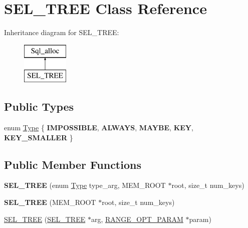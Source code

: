 \hypertarget{classSEL__TREE}{}\section{S\+E\+L\+\_\+\+T\+R\+EE Class Reference}
\label{classSEL__TREE}
Inheritance diagram for S\+E\+L\+\_\+\+T\+R\+EE\+:\begin{figure}[H]
\begin{center}
\leavevmode
\includegraphics[height=2.000000cm]{classSEL__TREE}
\end{center}
\end{figure}
\subsection*{Public Types}
\begin{DoxyCompactItemize}
\item 
enum \mbox{\hyperlink{classSEL__TREE_ab2c33faad20fa0700f23ed800de66cc8}{Type}} \{ \newline
{\bfseries I\+M\+P\+O\+S\+S\+I\+B\+LE}, 
{\bfseries A\+L\+W\+A\+YS}, 
{\bfseries M\+A\+Y\+BE}, 
{\bfseries K\+EY}, 
\newline
{\bfseries K\+E\+Y\+\_\+\+S\+M\+A\+L\+L\+ER}
 \}
\end{DoxyCompactItemize}
\subsection*{Public Member Functions}
\begin{DoxyCompactItemize}
\item 
\mbox{\label{classSEL__TREE_aca2f62c9e9cfffba813cdc3994e98d41}} 
{\bfseries S\+E\+L\+\_\+\+T\+R\+EE} (enum \mbox{\hyperlink{classSEL__TREE_ab2c33faad20fa0700f23ed800de66cc8}{Type}} type\+\_\+arg, M\+E\+M\+\_\+\+R\+O\+OT $\ast$root, size\+\_\+t num\+\_\+keys)
\item 
\mbox{\label{classSEL__TREE_a8da41c7b49c9eed4601af6c19e7252f4}} 
{\bfseries S\+E\+L\+\_\+\+T\+R\+EE} (M\+E\+M\+\_\+\+R\+O\+OT $\ast$root, size\+\_\+t num\+\_\+keys)
\item 
\mbox{\hyperlink{classSEL__TREE_aebc925ee4102808de1b168ec4989411c}{S\+E\+L\+\_\+\+T\+R\+EE}} (\mbox{\hyperlink{classSEL__TREE}{S\+E\+L\+\_\+\+T\+R\+EE}} $\ast$arg, \mbox{\hyperlink{classRANGE__OPT__PARAM}{R\+A\+N\+G\+E\+\_\+\+O\+P\+T\+\_\+\+P\+A\+R\+AM}} $\ast$param)
\end{DoxyCompactItemize}
